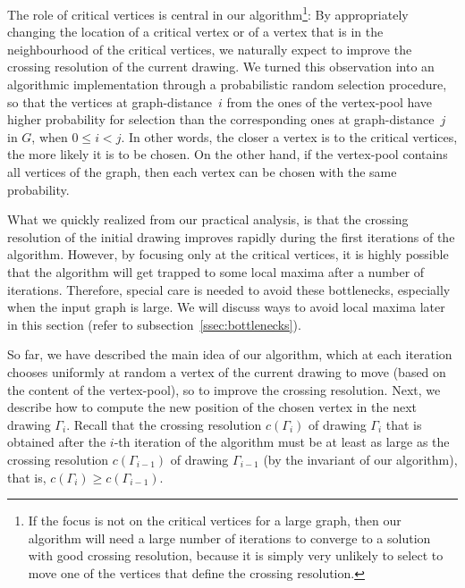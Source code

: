 \documentclass{comjnl}
\begin{document}
The role of critical vertices is central in our algorithm\footnote{If the focus is not on the critical vertices for a large graph, then our algorithm will need a large number of iterations to converge to a solution with good crossing resolution, because it is simply very unlikely to select to move one of the vertices that define the crossing resolution.}: By appropriately changing the location of a critical vertex or of a vertex that is in the neighbourhood of the critical vertices, we naturally expect to improve the crossing resolution of the current drawing. We turned this observation into an algorithmic implementation through a probabilistic random selection procedure, so that the vertices at graph-distance~$i$ from the ones of the vertex-pool have higher probability for selection than the corresponding ones at graph-distance~$j$  in $G$, when $0 \leq i<j$. In other words, the closer a vertex is to the critical vertices, the more likely it is to be chosen. On the other hand, if the vertex-pool contains all vertices of the graph, then each vertex can be chosen with the same probability.

What we quickly realized from our practical analysis, is that the crossing resolution of the initial drawing improves rapidly during the first iterations of the algorithm. However, by focusing only at the critical vertices, it is highly possible that the algorithm will get trapped to some local maxima after a number of iterations. Therefore, special care is needed to avoid these bottlenecks, especially when the input graph is large. We will discuss ways to avoid local maxima later in this section (refer to subsection~\ref{ssec:bottlenecks}).

So far, we have described the main idea of our algorithm, which at each iteration chooses uniformly at random a vertex of the current drawing to move (based on the content of the vertex-pool), so to improve the crossing resolution. Next, we describe how to compute the new position of the chosen vertex in the next drawing $\Gamma_i$. Recall that the crossing resolution $c(\Gamma_{i})$ of drawing $\Gamma_{i}$ that is obtained after the $i$-th iteration of the algorithm must be at least as large as the crossing resolution $c(\Gamma_{i-1})$ of drawing $\Gamma_{i-1}$ (by the invariant of our algorithm), that is, $c(\Gamma_i) \ge c(\Gamma_{i-1})$. 
\end{document}

